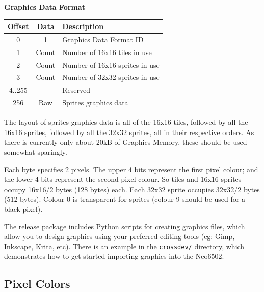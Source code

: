 \documentclass[12pt]{article}
\newcommand{\MonoSp}[1] {\fontsize{10pt}{10pt}\selectfont\texttt{#1}\normalsize}
\begin{document}
\begin{table}[h]
\centering\textbf{Graphics Data Format}                           \\
\begin{tabular}{ | c | c | l | }                                     \hline
\textbf{Offset} & \textbf{Data}  & \textbf{Description}           \\ \hline
0               & 1              & Graphics Data Format ID        \\ \hline
1               & Count          & Number of 16x16 tiles in use   \\ \hline
2               & Count          & Number of 16x16 sprites in use \\ \hline
3               & Count          & Number of 32x32 sprites in use \\ \hline
4..255          &                & Reserved                       \\ \hline
256             & Raw            & Sprites graphics data          \\ \hline
\end{tabular}
\end{table}

The layout of sprites graphics data is all of the 16x16 tiles,
followed by all the 16x16 sprites,
followed by all the 32x32 sprites, all in their respective orders.
As there is currently only about 20kB of Graphics Memory,
these should be used somewhat sparingly.
\newline

Each byte specifies 2 pixels. The upper 4 bits represent the first pixel colour;
and the lower 4 bits represent the second pixel colour.
So tiles and 16x16 sprites occupy 16x16/2 bytes (128 bytes) each.
Each 32x32 sprite occupies 32x32/2 bytes (512 bytes).
Colour 0 is transparent for sprites (colour 9 should be used for a black pixel).
\newline

The release package includes Python scripts for creating graphics files,
which allow you to design graphics using your preferred editing tools
(eg: Gimp, Inkscape, Krita, etc).
There is an example in the \MonoSp{crossdev/} directory,
which demonstrates how to get started importing graphics into the Neo6502.


\pagebreak


\subsection{Pixel Colors}\label{subsec:graphics-colors}
\end{document}
